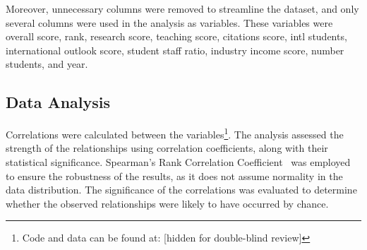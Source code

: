 \documentclass[conference]{IEEEtran}
\begin{document}
Moreover, unnecessary columns were removed to streamline the dataset, and only several columns were used in the analysis as variables. These variables were overall score, rank, research score, teaching score, citations score, intl students, international outlook score, student staff ratio, industry income score, number students, and year. 

\subsection{Data Analysis}

Correlations were calculated between the variables\footnote{Code and data can be found at:
	[hidden for double-blind review] 
}. 
The analysis assessed the strength of the relationships using correlation coefficients, along with their statistical significance. Spearman's Rank Correlation Coefficient~\cite{spearman1904general} was employed to ensure the robustness of the results, as it does not assume normality in the data distribution. The significance of the correlations was evaluated to determine whether the observed relationships were likely to have occurred by chance. 
\end{document}
